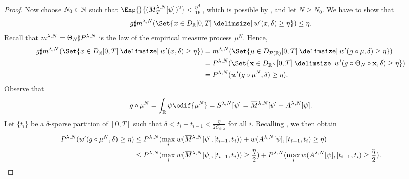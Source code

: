 \begin{proof}
  Now choose \( N_0 \in \mathbb{N} \) such that \(\Exp{}{ ( \ol{M}_T^{\lambda, N}[\psi] )^2 } < \frac{\eta^4}{16}\), which is possible by , and let \(N \geq N_0\).
  We have to show that
  \begin{equation}
    g \sharp \lawmu^{\lambda, N}(\Set{ x \in D_{\potspace}[0,T] \given w'(x,\delta) \geq \eta }) \leq \eta.
  \end{equation}
  Recall that \(m^{\lambda, N} = \Theta_N \sharp P^{\lambda, N}\) is the law of the empirical measure process \(\mu^N\).
  Hence,
  \begin{equation}
    \begin{split}
      g \sharp \lawmu^{\lambda, N}(\Set{ x \in D_{\potspace}[0,T] \given w'(x,\delta) \geq \eta })
       & = \lawmu^{\lambda, N}(\Set{ \mu \in D_{\cP(\potspace)}[0,T] \given w'(g \circ \mu,\delta) \geq \eta })              \\
       & = P^{\lambda, N}(\Set{ \bm{x} \in D_{\potspace^N}[0,T] \given w'(g \circ \Theta_N \circ \bm{x},\delta) \geq \eta }) \\
       & = P^{\lambda, N}( w'(g \circ \mu^N,\delta) \geq \eta ).
    \end{split}
  \end{equation}
  Observe that
  \begin{equation}
    g \circ \mu^N = \int_\potspace \psi \odif{\mu^N} = S^{\lambda, N}[\psi] = \ol{M}^{\lambda, N}[\psi] - A^{\lambda, N}[\psi].
  \end{equation}
  Let \( \{t_i\} \) be a \( \delta \)-sparse partition of \( [0,T] \) such that \(\delta < t_i - t_{i-1} < \frac{\eta}{2C_{\psi, \lambda}}\) for all \( i \).
  Recalling , we then obtain %
  \begin{equation}
    \begin{split}
      P^{\lambda, N} (w'(g \circ \mu^N, \delta) \geq \eta)
       & \leq P^{\lambda, N}( \max_i w(\ol{M}^{\lambda, N}[\psi], [t_{i-1}, t_i)) + w(A^{\lambda, N}[\psi], [t_{i-1}, t_i) \geq \eta)                                                        \\
       & \leq P^{\lambda, N}( \max_i w(\ol{M}^{\lambda, N}[\psi], [t_{i-1}, t_i)) \geq \frac{\eta}{2}) + P^{\lambda, N}( \max_i w(A^{\lambda, N}[\psi], [t_{i-1}, t_i) \geq \frac{\eta}{2}).
    \end{split}
  \end{equation}

\end{proof}
